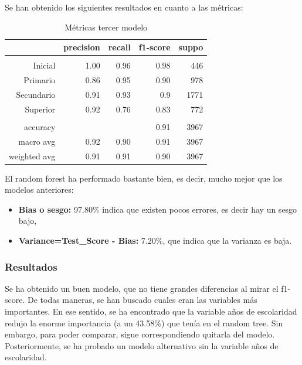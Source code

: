 \documentclass[a4paper]{article}
\begin{document}
            Se han obtenido los siguientes resultados en cuanto a las métricas:
            \begin{table}[H]
                \centering
                \begin{tabular}{rrrrr}
                    \toprule
                    ~ & precision & recall & f1-score & suppo \\ \midrule
                    & & & & \\
                    Inicial    & 1.00 & 0.96 & 0.98 & 446 \\
                    Primario   & 0.86 & 0.95 & 0.90 & 978 \\
                    Secundario & 0.91 & 0.93 & 0.9 & 1771 \\
                    Superior   & 0.92 & 0.76 & 0.83 & 772 \\
                    & & & & \\
                    accuracy & & & 0.91 & 3967 \\
                    macro avg & 0.92 & 0.90 & 0.91 & 3967 \\
                    weighted avg & 0.91 & 0.91 & 0.90 & 3967 \\
                    \bottomrule
                \end{tabular}
                \caption{Métricas tercer modelo}
                \label{Thrid model metrics}
            \end{table}

             El random forest ha performado bastante bien, es decir, mucho mejor que los modelos anteriores:
             \begin{itemize}
                \item \textbf{Bias o sesgo:} 97.80\% indica que existen pocos errores, es decir hay un sesgo bajo,
                \item \textbf{Variance=Test\_Score - Bias:} 7.20\%, que indica que la varianza es baja.
             \end{itemize}

            \subsubsection*{Resultados}

             Se ha obtenido un buen modelo, que no tiene grandes diferencias al mirar el f1-score. De todas maneras, se han buscado cuales eran las variables más importantes. En ese sentido, se ha encontrado que la variable años de escolaridad redujo la enorme importancia (a un 43.58\%) que tenía en el random tree. Sin embargo, para poder comparar, sigue correspondiendo quitarla del modelo. Posteriormente, se ha probado un modelo alternativo sin la variable años de escolaridad. 
\end{document}
